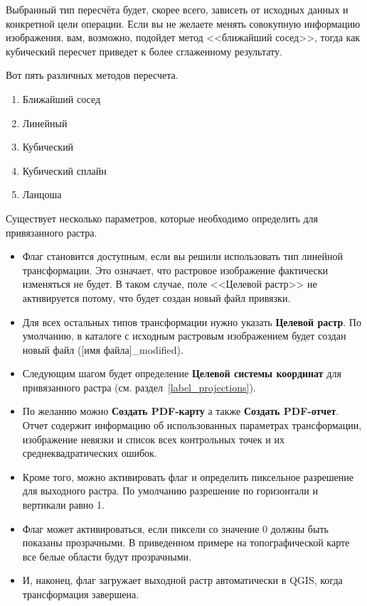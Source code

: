 
Выбранный тип пересчёта будет, скорее всего, зависеть от исходных данных
и конкретной цели операции. Если вы не желаете менять совокупную
информацию изображения, вам, возможно, подойдет метод <<ближайший сосед>>,
тогда как кубический пересчет приведет к более сглаженному результату.

Вот пять различных методов пересчета.

\begin{enumerate}
\item Ближайший сосед
\item Линейный
\item Кубический
\item Кубический сплайн
\item Ланцоша
\end{enumerate}


Существует несколько параметров, которые необходимо определить для
привязанного растра.

\begin{itemize}[label=--]
\item Флаг  становится доступным, если
вы решили использовать тип линейной трансформации. Это
означает, что растровое изображение фактически изменяться не будет.
В таком случае, поле <<Целевой растр>> не активируется потому, что
будет создан новый файл привязки.
\item Для всех остальных типов трансформации нужно указать
\textbf{Целевой растр}. По умолчанию, в каталоге с исходным растровым
изображением будет создан новый файл ([имя файла]\_modified).
\item Следующим шагом будет определение \textbf{Целевой системы координат}
для привязанного растра (см. раздел~\ref{label_projections}).
\item По желанию можно \textbf{Создать PDF-карту} а также
\textbf{Создать PDF-отчет}. Отчет содержит информацию об использованных
параметрах трансформации, изображение невязки и список всех контрольных
точек и их среднеквадратических ошибок.
\item Кроме того, можно активировать флаг
 и определить пиксельное разрешение
для выходного растра. По умолчанию разрешение по горизонтали и вертикали
равно 1.
\item Флаг 
может активироваться, если пиксели со значение 0 должны быть показаны
прозрачными. В приведенном примере на топографической карте все белые
области будут прозрачными.
\item И, наконец, флаг  загружает
выходной растр автоматически в QGIS, когда трансформация завершена.
\end{itemize}

